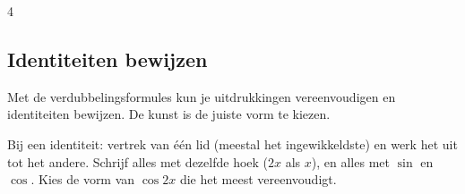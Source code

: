 \begin{alleenvoor}{4}
\begin{oefeningen}
\end{oefeningen}

\subsection{Identiteiten bewijzen}

Met de verdubbelingsformules kun je uitdrukkingen vereenvoudigen en identiteiten bewijzen. De kunst is de juiste vorm te kiezen.


\begin{werkwijze}
Bij een identiteit: vertrek van één lid (meestal het ingewikkeldste) en werk het uit tot het andere. Schrijf alles met dezelfde hoek ($2x$ als $x$), en alles met $\sin$ en $\cos$. Kies de vorm van $\cos 2x$ die het meest vereenvoudigt.
\end{werkwijze}

\begin{oefeningen}
\end{oefeningen}
\end{alleenvoor}

